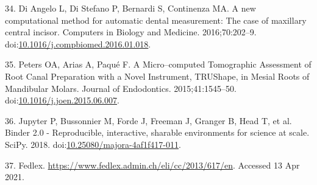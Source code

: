\documentclass[
  american,
]{article}
\newenvironment{cslreferences}%
  {}%
  {\par}
\begin{document}
\begin{cslreferences}
\leavevmode\hypertarget{ref-1Egw08k0d}{}%
34. Di Angelo L, Di Stefano P, Bernardi S, Continenza MA. A new computational method for automatic dental measurement: The case of maxillary central incisor. Computers in Biology and Medicine. 2016;70:202--9. doi:\href{https://doi.org/10.1016/j.compbiomed.2016.01.018}{10.1016/j.compbiomed.2016.01.018}.

\leavevmode\hypertarget{ref-RxErLYuw}{}%
35. Peters OA, Arias A, Paqué F. A Micro--computed Tomographic Assessment of Root Canal Preparation with a Novel Instrument, TRUShape, in Mesial Roots of Mandibular Molars. Journal of Endodontics. 2015;41:1545--50. doi:\href{https://doi.org/10.1016/j.joen.2015.06.007}{10.1016/j.joen.2015.06.007}.

\leavevmode\hypertarget{ref-Q20Bxdsr}{}%
36. Jupyter P, Bussonnier M, Forde J, Freeman J, Granger B, Head T, et al. Binder 2.0 - Reproducible, interactive, sharable environments for science at scale. SciPy. 2018. doi:\href{https://doi.org/10.25080/majora-4af1f417-011}{10.25080/majora-4af1f417-011}.

\leavevmode\hypertarget{ref-10OKzEtEb}{}%
37. Fedlex. \url{https://www.fedlex.admin.ch/eli/cc/2013/617/en}. Accessed 13 Apr 2021.
\end{cslreferences}
\end{document}
